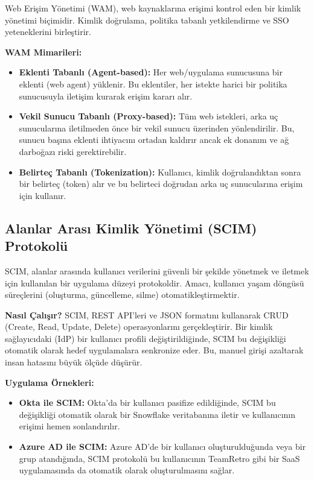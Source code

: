 Web Erişim Yönetimi (WAM), web kaynaklarına erişimi kontrol eden bir kimlik yönetimi biçimidir. Kimlik doğrulama, politika tabanlı yetkilendirme ve SSO yeteneklerini birleştirir.

\textbf{WAM Mimarileri:}
\begin{itemize}
    \item \textbf{Eklenti Tabanlı (Agent-based):} Her web/uygulama sunucusuna bir eklenti (web agent) yüklenir. Bu eklentiler, her istekte harici bir politika sunucusuyla iletişim kurarak erişim kararı alır.
    \item \textbf{Vekil Sunucu Tabanlı (Proxy-based):} Tüm web istekleri, arka uç sunucularına iletilmeden önce bir vekil sunucu üzerinden yönlendirilir. Bu, sunucu başına eklenti ihtiyacını ortadan kaldırır ancak ek donanım ve ağ darboğazı riski gerektirebilir.
    \item \textbf{Belirteç Tabanlı (Tokenization):} Kullanıcı, kimlik doğrulandıktan sonra bir belirteç (token) alır ve bu belirteci doğrudan arka uç sunucularına erişim için kullanır.
\end{itemize}

\subsection{Alanlar Arası Kimlik Yönetimi (SCIM) Protokolü}

SCIM, alanlar arasında kullanıcı verilerini güvenli bir şekilde yönetmek ve iletmek için kullanılan bir uygulama düzeyi protokoldir. Amacı, kullanıcı yaşam döngüsü süreçlerini (oluşturma, güncelleme, silme) otomatikleştirmektir.

\textbf{Nasıl Çalışır?} SCIM, REST API'leri ve JSON formatını kullanarak CRUD (Create, Read, Update, Delete) operasyonlarını gerçekleştirir. Bir kimlik sağlayıcıdaki (IdP) bir kullanıcı profili değiştirildiğinde, SCIM bu değişikliği otomatik olarak hedef uygulamalara senkronize eder. Bu, manuel girişi azaltarak insan hatasını büyük ölçüde düşürür.

\textbf{Uygulama Örnekleri:}
\begin{itemize}
    \item \textbf{Okta ile SCIM:} Okta'da bir kullanıcı pasifize edildiğinde, SCIM bu değişikliği otomatik olarak bir Snowflake veritabanına iletir ve kullanıcının erişimi hemen sonlandırılır.
    \item \textbf{Azure AD ile SCIM:} Azure AD'de bir kullanıcı oluşturulduğunda veya bir grup atandığında, SCIM protokolü bu kullanıcının TeamRetro gibi bir SaaS uygulamasında da otomatik olarak oluşturulmasını sağlar.
\end{itemize}

